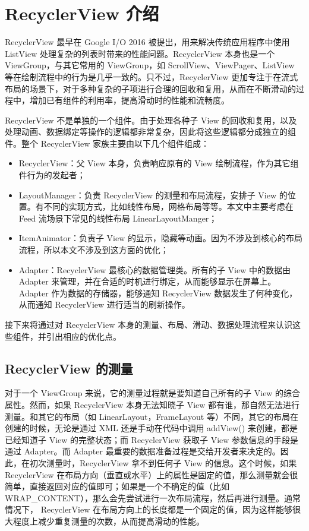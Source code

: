 \chapter{RecyclerView 介绍}

RecyclerView 最早在 Google I/O 2016 被提出，用来解决传统应用程序中使用 ListView 处理复杂的列表时带来的性能问题。RecyclerView 本身也是一个 ViewGroup，与其它常用的 ViewGroup，如 ScrollView、ViewPager、ListView 等在绘制流程中的行为是几乎一致的。\cite{mawlood2022listview}只不过，RecyclerView 更加专注于在流式布局的场景下，对于多种复杂的子项进行合理的回收和复用，从而在不断滑动的过程中，增加已有组件的利用率，提高滑动时的性能和流畅度。

RecyclerView 不是单独的一个组件。由于处理各种子 View 的回收和复用，以及处理动画、数据绑定等操作的逻辑都非常复杂，因此将这些逻辑都分成独立的组件。整个 RecyclerView 家族主要由以下几个组件组成：

\begin{itemize}
    \item RecyclerView：父 View 本身，负责响应原有的 View 绘制流程，作为其它组件行为的发起者；
    \item LayoutManager：负责 RecyclerView 的测量和布局流程，安排子 View 的位置。有不同的实现方式，比如线性布局，网格布局等等。本文中主要考虑在 Feed 流场景下常见的线性布局 LinearLayoutManger；
    \item ItemAnimator：负责子 View 的显示，隐藏等动画。因为不涉及到核心的布局流程，所以本文不涉及到这方面的优化；
    \item Adapter：RecyclerView 最核心的数据管理类。所有的子 View 中的数据由 Adapter 来管理，并在合适的时机进行绑定，从而能够显示在屏幕上。Adapter 作为数据的存储器，能够通知 RecyclerView 数据发生了何种变化，从而通知 RecyclerView 进行适当的刷新操作。
\end{itemize}

接下来将通过对 RecyclerView 本身的测量、布局、滑动、数据处理流程来认识这些组件，并引出相应的优化点。

\section{RecyclerView 的测量}

对于一个 ViewGroup 来说，它的测量过程就是要知道自己所有的子 View 的综合属性。然而，如果 RecyclerView 本身无法知晓子 View 都有谁，那自然无法进行测量。和其它的布局（如 LinearLayout，FrameLayout 等）不同，其它的布局在创建的时候，无论是通过 XML 还是手动在代码中调用 addView() 来创建，都是已经知道子 View 的完整状态；而 RecyclerView 获取子 View 参数信息的手段是通过 Adapter。而 Adapter 最重要的数据准备过程是交给开发者来决定的。因此，在初次测量时，RecyclerView 拿不到任何子 View 的信息。这个时候，如果RecyclerView 在布局方向（垂直或水平）上的属性是固定的值，那么测量就会很简单，直接返回对应的值即可；如果是一个不确定的值（比如 WRAP\_CONTENT），那么会先尝试进行一次布局流程，然后再进行测量。通常情况下， RecyclerView 在布局方向上的长度都是一个固定的值，因为这样能够很大程度上减少重复测量的次数，从而提高滑动的性能。

